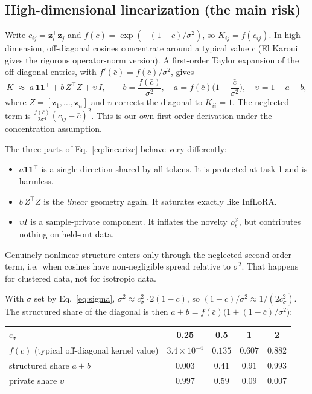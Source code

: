 \documentclass[11pt]{article}
\theoremstyle{plain}
\theoremstyle{definition}
\theoremstyle{remark}
\newcommand{\z}{\bm{z}}
\begin{document}
\subsection{High-dimensional linearization (the main risk)}\label{sec:highdim}
Write $c_{ij}=\z_i^{\top}\z_j$ and $f(c)=\exp(-(1-c)/\sigma^2)$, so $K_{ij}=f(c_{ij})$. In high dimension, off-diagonal cosines concentrate around a typical value $\bar c$ (El Karoui~\cite{elkaroui} gives the rigorous operator-norm version). A first-order Taylor expansion of the off-diagonal entries, with $f'(\bar c)=f(\bar c)/\sigma^2$, gives
\begin{equation}\label{eq:linearize}
K\;\approx\;a\,\bm 1\bm 1^{\top}+b\,Z^{\top}Z+\upsilon\,I,\qquad
b=\frac{f(\bar c)}{\sigma^2},\quad a=f(\bar c)\Big(1-\frac{\bar c}{\sigma^2}\Big),\quad \upsilon=1-a-b,
\end{equation}
where $Z=[\z_1,\dots,\z_n]$ and $\upsilon$ corrects the diagonal to $K_{ii}=1$. The neglected term is $\frac{f(\bar c)}{2\sigma^4}(c_{ij}-\bar c)^2$. This is our own first-order derivation under the concentration assumption.

The three parts of Eq.~\eqref{eq:linearize} behave very differently:
\begin{itemize}[nosep]
\item $a\bm1\bm1^{\top}$ is a single direction shared by all tokens. It is protected at task 1 and is harmless.
\item $b\,Z^{\top}Z$ is the \emph{linear} geometry again. It saturates exactly like InfLoRA.
\item $\upsilon I$ is a sample-private component. It inflates the novelty $\rho^\varphi_t$, but contributes nothing on held-out data.
\end{itemize}
Genuinely nonlinear structure enters only through the neglected second-order term, i.e.\ when cosines have non-negligible spread relative to $\sigma^2$. That happens for clustered data, not for isotropic data.

With $\sigma$ set by Eq.~\eqref{eq:sigma}, $\sigma^2\approx c_\sigma^2\cdot 2(1-\bar c)$, so $(1-\bar c)/\sigma^2\approx 1/(2c_\sigma^2)$. The structured share of the diagonal is then
$a+b=f(\bar c)\big(1+(1-\bar c)/\sigma^2\big)$:

\begin{center}
\begin{tabular}{@{}lcccc@{}}
\toprule
$c_\sigma$ & 0.25 & 0.5 & 1 & 2\\
\midrule
$f(\bar c)$ (typical off-diagonal kernel value) & $3.4\times10^{-4}$ & $0.135$ & $0.607$ & $0.882$\\
structured share $a+b$ & $0.003$ & $0.41$ & $0.91$ & $0.993$\\
private share $\upsilon$ & $0.997$ & $0.59$ & $0.09$ & $0.007$\\
\bottomrule
\end{tabular}
\end{center}
\end{document}
